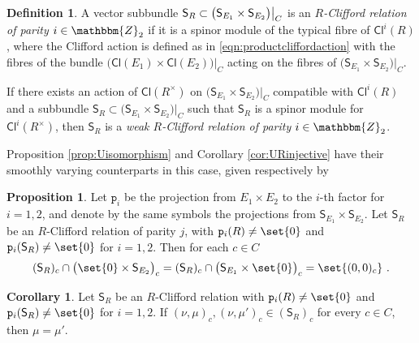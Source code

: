 \documentclass[a4paper, reqno, 11pt]{amsart}
\numberwithin{equation}{section}
\theoremstyle{definition}
\newtheorem{definition}[equation]{Definition}
\newtheorem{proposition}[equation]{Proposition}
\newtheorem{corollary}[equation]{Corollary}
\newcommand{\rmp}{\mathtt{p}}
\newcommand{\IZ}{\mathbbm{Z}}
\newcommand{\Cl}{\mathsf{Cl}}
\newcommand{\sfS}{{\mathsf{S}}}
\theoremstyle{remark}
\begin{document}
\begin{definition} \label{def:Rcliffrelation}
    A vector subbundle ${\sf S}_R \subset \bigl( \sfS_{E_1}\times\sfS_{E_2}\bigr) \big \rvert_C$ is an \emph{$R$-Clifford relation of parity $i \in \IZ_2$} if it is a spinor module of the typical fibre of $\Cl^i (R)$, where the Clifford action is defined as in \eqref{eqn:productcliffordaction} with the fibres of the bundle $\big(\Cl(E_1)\times \Cl(E_2)\big) \big\rvert_C$ acting on the fibres of $ \big(\sfS_{E_1}\times\sfS_{E_2} \big) \big\rvert_C $.

    If there exists an action of $\Cl(R^\times)$ on $\bigl( \sfS_{E_1}\times\sfS_{E_2}\bigr) \big \rvert_C$ compatible with $\Cl^i(R)$ and a subbundle $\sfS_R \subset \bigl( \sfS_{E_1}\times\sfS_{E_2}\bigr) \big \rvert_C$ such that $\sfS_R$ is a spinor module for $\Cl^i(R^\times)$, then $\sfS_R$ is a \emph{weak $R$-Clifford relation of parity $i \in \IZ_2$}.
\end{definition}

Proposition \ref{prop:Uisomorphism} and Corollary \ref{cor:URinjective} have their smoothly varying counterparts in this case, given respectively by

\begin{proposition}\label{prop:Uisomorphismsmooth}
    Let $\rmp_i$ be the projection from $E_1 \times E_2$ to the $i$-th factor for $i=1,2$, and denote by the same symbols the projections from $\sfS_{E_1}\times\sfS_{E_2}$. Let $\sfS_R$ be an $R$-Clifford relation of parity $j$, with $\rmp_i(R) \neq \set{0}$ and $\rmp_i(\sfS_R) \neq \set{0}$ for $i=1,2$. Then for each $c \in C$
    \begin{align}
        (\sfS_R)_c \cap \big(\set{0} \times \sfS_{E_2} \big)_c = (\sfS_R)_c \cap \big(\sfS_{E_1} \times \set{0} \big)_c = \set{(0,0)_c} \ .
\end{align}
\end{proposition}

\begin{corollary}\label{cor:URinjectivesmooth}
    Let $\sfS_R$ be an $R$-Clifford relation with $\rmp_i(R) \neq \set{0}$ and $\rmp_i(\sfS_R) \neq \set{0}$ for $i=1,2$. If $(\nu, \mu)_c, (\nu, \mu')_c\in (\sfS_R)_c$ for every $c\in C$, then $\mu = \mu'$.
\end{corollary}
\end{document}
